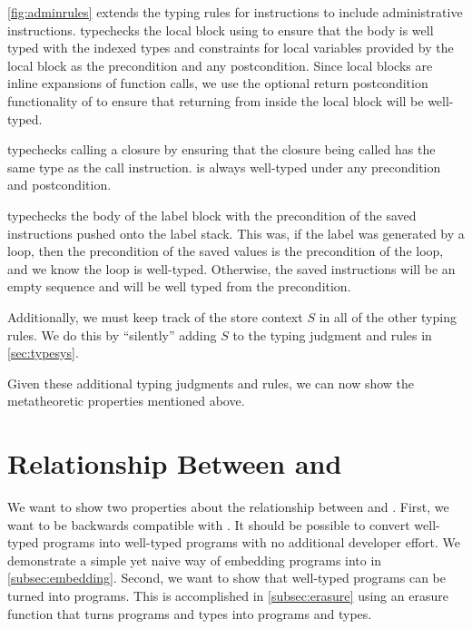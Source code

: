 \autoref{fig:adminrules} extends the \name typing rules for instructions to include administrative instructions.
 typechecks the local block using  to ensure that the body is well typed with the indexed types and constraints for local variables provided by the local block as the precondition and any postcondition.
Since local blocks are inline expansions of function calls, we use the optional return postcondition functionality of  to ensure that returning from inside the local block will be well-typed.

 typechecks calling a closure by ensuring that the closure being called has the same type as the call instruction.
 is always well-typed under any precondition and postcondition.

 typechecks the body of the label block with the precondition of the saved instructions pushed onto the label stack.
This was, if the label was generated by a loop, then the precondition of the saved values is the precondition of the loop, and we know the loop is well-typed.
Otherwise, the saved instructions will be an empty sequence and will be well typed from the precondition.

Additionally, we must keep track of the store context $S$ in all of the other typing rules.
We do this by ``silently'' adding $S$ to the typing judgment and rules in \autoref{sec:typesys}.

Given these additional typing judgments and rules, we can now show the metatheoretic properties mentioned above.

\section{Relationship Between \wasm and \name}
We want to show two properties about the relationship between \wasm and \name.
First, we want \name to be backwards compatible with \wasm.
It should be possible to convert well-typed \wasm programs into well-typed \name programs with no additional developer effort.
We demonstrate a simple yet naive way of embedding \wasm programs into \name in \autoref{subsec:embedding}.
Second, we want to show that well-typed \name programs can be turned into \wasm programs.
This is accomplished in \autoref{subsec:erasure} using an erasure function that turns \name programs and types into \wasm programs and types.




